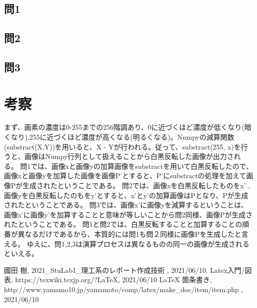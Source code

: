 \documentclass[a4paper, 11pt, titlepage]{jsarticle}
\begin{document}
\subsection{問1}

\clearpage
\subsection{問2}


\subsection{問3}

\clearpage

\section{考察}
まず、画素の濃度は0-255までの256階調あり、0に近づくほど濃度が低くなり(暗くなり),255に近づくほど濃度が高くなる(明るくなる)。Numpyの減算関数(substract(X,Y))を用いると、X - Yが行われる。従って、substract(255, x)を行うと、画像はNumpy行列として扱えることから白黒反転した画像が出力される。
問1では、画像xと画像yの加算画像をsubstractを用いて白黒反転したので、画像xと画像yを加算した画像を画像P'とすると、P’にsubstractの処理を加えて画像Pが生成されたということである。
問2では、画像xを白黒反転したものをx' ,画像yを白黒反転したのもをy'とすると、x'とy'の加算画像はPとなり、Pが生成されたということである。
問3では、画像x'に画像yを減算するということは、画像x'に画像y'を加算することと意味が等しいことから問2同様、画像Pが生成されたということである。
問1と問2では、白黒反転することと加算することの順番が異なるだけであるから、本質的には問1も問２同様に画像Pを生成したと言える。
ゆえに、問1,2,3は演算プロセスは異なるものの同一の画像が生成されるといえる。

\begin{thebibliography}{99}
 國田 樹, 2021\_StuLab1\_理工系のレポート作成技術 , 2021/06/10.
 Latex入門/図表, https://texwiki.texjp.org/?LaTeX, 2021/06/10
 LaTeX 箇条書き, http://www.yamamo10.jp/yamamoto/comp/latex/make\_doc/item/item.php , 2021/06/10
\end{thebibliography}
\end{document}
